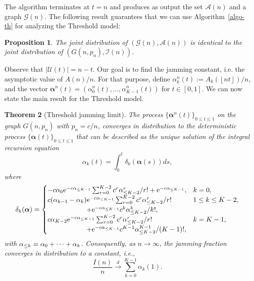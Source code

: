 \documentclass[11pt,a4paper, reqno]{article}
\newtheorem{theorem}{Theorem}
\newtheorem{proposition}[theorem]{Proposition}
\begin{document}
The algorithm terminates at $t=n$ and produces as output the set $\mathcal{A}(n)$ and a graph $\mathcal{G}(n)$. The following result guarantees that we can use Algorithm~\ref{algo-th} for analyzing the Threshold model:
\begin{proposition}\label{prop:thres}
The joint distribution of $(\mathcal{G}(n),\mathcal{A}(n))$ is identical to the joint distribution of $(G(n,p_n),\mathcal{I}(n))$.
\end{proposition}
Observe that $|\mathcal{U}(t)|=n-t$.
Our goal is to find the jamming constant, i.e. the asymptotic value of $A(n)/n$. For that purpose, define $\alpha^n_k(t):=A_k({\ensuremath{\left\lfloor {nt} \right\rfloor}})/n$, and the vector ${\ensuremath{\boldsymbol{{\alpha}}}}^n(t)=(\alpha^n_0(t),\ldots,\alpha^n_{K-1}(t))$ for $t\in [0,1]$.
 We can now state the main result for the Threshold model.
\begin{theorem}[{Threshold jamming limit}]\label{th:threshold}
The process $\{{\ensuremath{\boldsymbol{{\alpha}}}}^n(t)\}_{0\leq t\leq1}$ on the graph $G(n,p_n)$ with $p_n=c/n$, converges in distribution  to the deterministic process $\{{\ensuremath{\boldsymbol{{\alpha}}}}(t)\}_{0\leq t\leq 1}$ that can be described as the unique solution of the  integral recursion equation
\begin{equation}\label{eq:alpha-threshold}
 \alpha_k(t)=\int_0^t\delta_k({\ensuremath{\boldsymbol{{\alpha}}}}(s))ds,
\end{equation} where
\begin{equation}\label{def:delta-th}
 \delta_k({\ensuremath{\boldsymbol{{\alpha}}}})=
 \begin{cases}
  -c\alpha_{0}{\ensuremath{\mathrm{e}}}^{-c\alpha_{{\scriptscriptstyle} \leq K-1}}\sum_{r=0}^{K-2}c^r\alpha_{{\scriptscriptstyle} \leq K-2}^r/r!+{\ensuremath{\mathrm{e}}}^{-c\alpha_{{\scriptscriptstyle} \leq K-1}},  &k=0,\\
  c(\alpha_{k-1}-\alpha_k){\ensuremath{\mathrm{e}}}^{-c\alpha_{{\scriptscriptstyle} \leq K-1}}\sum_{r=0}^{K-2}c^r\alpha_{{\scriptscriptstyle} \leq K-2}^r/r! & 1\leq k\leq K-2,\\
 \hspace*{2cm} +{\ensuremath{\mathrm{e}}}^{-c\alpha_{{\scriptscriptstyle} \leq K-1}}c^k\alpha_{{\scriptscriptstyle} \leq K-2}^k/k!,&\\
 c\alpha_{K-2}{\ensuremath{\mathrm{e}}}^{-c\alpha_{{\scriptscriptstyle} \leq  K-1}}\sum_{r=0}^{K-2}c^r\alpha_{{\scriptscriptstyle} \leq  K-2}^r/r! & k=K-1,\\
 \hspace*{2cm} +{\ensuremath{\mathrm{e}}}^{-c\alpha_{{\scriptscriptstyle} \leq K-1}}c^{K-1}\alpha_{{\scriptscriptstyle} \leq K-2}^{K-1}/(K-1)!,&
 \end{cases}
\end{equation} with $\alpha_{{\scriptscriptstyle} \leq k}=\alpha_0+\dots+\alpha_k$.
Consequently, as $n\to\infty$, the jamming fraction converges in distribution to a constant, i.e.,
\begin{equation}
\frac{I(n)}{n}{\ensuremath{\xrightarrow{d}}} \sum_{k=0}^{K-1}\alpha_k(1).
\end{equation}
\end{theorem}
\end{document}
